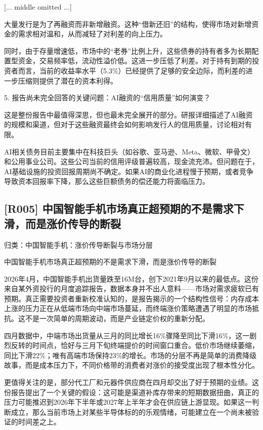 \documentclass[11pt]{ctexart}
\begin{document}
[... middle omitted ...]

大量发行是为了再融资而非新增融资。这种“借新还旧”的结构，使得市场对新增资金的需求相对温和，从而减轻了对利差的向上压力。

同时，由于存量增速低，市场中的“老券”比例上升，这些债券的持有者多为长期配置型资金，交易频率低，流动性溢价低。这进一步压低了利差。对于持有到期的投资者而言，当前的收益率水平（5.3\%）已经提供了足够的安全边际，而利差的进一步压缩则提供了潜在的资本利得。

5. 报告尚未完全回答的关键问题：AI融资的“信用质量”如何演变？

这是整份报告中最值得深思，但也最未完全展开的部分。研报详细描述了AI融资的规模和渠道，但对于这些融资最终会如何影响发行人的信用质量，讨论相对有限。

AI相关债务目前主要集中在科技巨头（如谷歌、亚马逊、Meta、微软、甲骨文）和公用事业公司。这些公司当前的信用评级普遍较高，现金流充沛。但问题在于，AI基础设施的投资回报周期尚不确定。如果AI的商业化进程慢于预期，或者竞争导致资本回报率下降，那么这些巨额债务的偿还能力将面临压力。

\subsection{[R005] 中国智能手机市场真正超预期的不是需求下滑，而是涨价传导的断裂}
{\small\color{refgray}归类：中国智能手机：涨价传导断裂与市场分层}

中国智能手机市场真正超预期的不是需求下滑，而是涨价传导的断裂

2026年4月，中国智能手机出货量跌至16M台，创下2021年9月以来的最低点。这份来自某外资投行的月度追踪报告，数据本身并不出人意料——市场对需求疲软已有预期。真正需要投资者重新校准认知的，是报告揭示的一个结构性信号：内存成本上涨的压力正在从低端市场向中端市场蔓延，而终端涨价策略遭遇了明显的市场抵抗。这不是一次简单的周期波动，而是产业链定价权的重新分配。

四月数据中，中端市场出货量从三月的同比增长16\%骤降至同比下滑16\%，这一剧烈反转的时间点，恰好与三月下旬终端提价的时间窗口重合。低价市场继续萎缩，同比下滑22\%；唯有高端市场保持23\%的增长。市场的分层不再是简单的消费降级故事，而是成本压力下，不同价格带的消费者对涨价的接受度出现了根本性分化。

更值得关注的是，部分代工厂和元器件供应商在四月却交出了好于预期的业绩。这份报告提出了一个关键的假设：这可能是渠道补库存带来的短期数据扭曲，真正的压力可能推迟到2026年下半年或2027年上半年才会在供应链上游显现。如果这一判断成立，那么当前市场上对某些半导体标的的乐观情绪，可能建立在一个尚未被验证的时间差之上。
\end{document}
